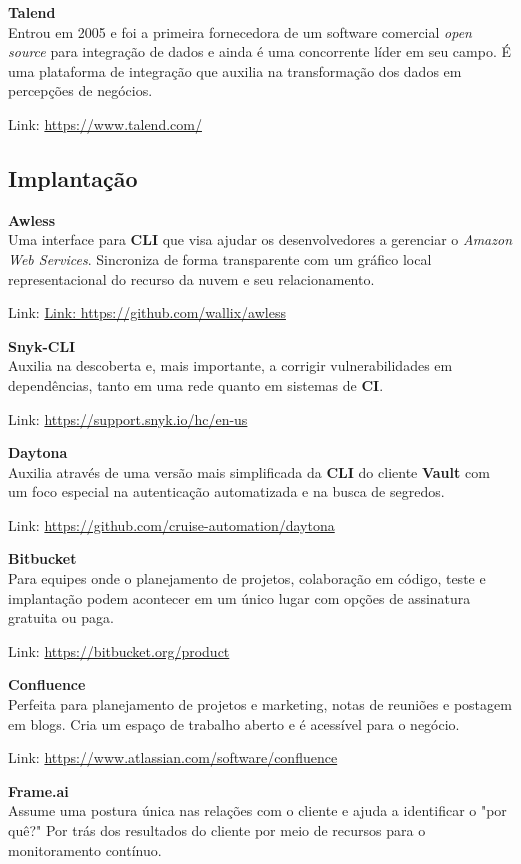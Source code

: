 \documentclass[fleqn,10pt]{SelfArx} %
\begin{document}
\textbf{Talend} \\
Entrou em 2005 e foi a primeira fornecedora de um software comercial \textit{open source} para integração de dados e ainda é uma concorrente líder em seu campo. É uma plataforma de integração que auxilia na transformação dos dados em percepções de negócios. 

Link: \url{https://www.talend.com/}

\subsection*{Implantação}

\textbf{Awless} \\
Uma interface para \textbf{CLI} que visa ajudar os desenvolvedores a gerenciar o \textit{Amazon Web Services}. Sincroniza de forma transparente com um gráfico local representacional do recurso da nuvem e seu relacionamento.

Link: \url{Link: https://github.com/wallix/awless}

\textbf{Snyk-CLI} \\
Auxilia na descoberta e, mais importante, a corrigir vulnerabilidades em dependências, tanto em uma rede quanto em sistemas de \textbf{CI}.

Link: \url{https://support.snyk.io/hc/en-us}

\textbf{Daytona} \\
Auxilia através de uma versão mais simplificada da \textbf{CLI} do cliente \textbf{Vault} com um foco especial na autenticação automatizada e na busca de segredos.

Link: \url{https://github.com/cruise-automation/daytona}

\textbf{Bitbucket} \\
Para equipes onde o planejamento de projetos, colaboração em código, teste e implantação podem acontecer em um único lugar com opções de assinatura gratuita ou paga.

Link: \url{https://bitbucket.org/product}

\textbf{Confluence} \\
Perfeita para planejamento de projetos e marketing, notas de reuniões e postagem em blogs. Cria um espaço de trabalho aberto e é acessível para o negócio.

Link: \url{https://www.atlassian.com/software/confluence}

\textbf{Frame.ai} \\
Assume uma postura única nas relações com o cliente e ajuda a identificar o "por quê?" Por trás dos resultados do cliente por meio de recursos para o monitoramento contínuo.
\end{document}
